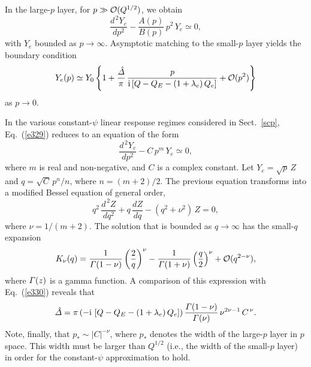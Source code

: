 \documentclass[12pt,prb,aps]{revtex4-1}
\begin{document}
In the large-$p$ layer, for  $p\gg {\cal O}(Q^{1/2})$, we obtain 
\begin{equation}\label{e329}
\frac{d^{\,2} Y_e}{dp^2} - \frac{A(p)}{B(p)}\,p^2\,Y_e\simeq 0,
\end{equation}
with $Y_e$ bounded as $p\rightarrow \infty$. Asymptotic matching to the small-$p$ layer yields the boundary
condition 
\begin{equation}\label{e330}
Y_e(p)\simeq Y_0\left\{1+ \frac{\hat{\mit\Delta}}{\pi}\,\frac{p}{{\rm i}\,[Q-Q_E-(1+\lambda_e)\,Q_e]}+ {\cal O}(p^2)\right\}
\end{equation}
as $p\rightarrow 0$. 

In the various constant-$\psi$ linear response regimes considered in Sect.~\ref{scp}, Eq.~(\ref{e329}) reduces to an
equation of the form
\begin{equation}\label{e330a}
\frac{d^{\,2}Y_e}{dp^2}- C\,p^m\,Y_e\simeq 0,
\end{equation}
where $m$ is real and non-negative, and $C$ is a complex constant. Let $Y_e=\sqrt{p}\,Z$ and $q=\sqrt{C}\,p^n/n$, where
$n=(m+2)/2$. The previous equation transforms into a modified Bessel equation of general order, 
\begin{equation}
q^2\,\frac{d^{\,2}Z}{dq^2} + q\,\frac{dZ}{dq} - (q^2+\nu^2)\,Z =0,
\end{equation}
where $\nu=1/(m+2)$. The solution that is bounded as $q\rightarrow \infty$ has the small-$q$
expansion
\begin{equation}\label{e332}
K_\nu(q)= \frac{1}{{\mit\Gamma}(1-\nu)}\left(\frac{2}{q}\right)^\nu - \frac{1}{{\mit\Gamma}(1+\nu)}\left(\frac{q}{2}\right)^\nu + {\cal O}(q^{2-\nu}),
\end{equation}
where ${\mit\Gamma}(z)$ is a gamma function. 
A comparison of this expression with Eq.~(\ref{e330}) reveals that
\begin{equation}
\hat{\mit\Delta} = \pi\,(-{\rm i}\,\left[Q-Q_E-(1+\lambda_e)\,Q_e\right])\, \frac{{\mit\Gamma}(1-\nu)}{{\mit\Gamma}(\nu)}\,\nu^{2\nu-1}\,C^{\,\nu}.
\end{equation}
Note, finally, that $p_\ast\sim |C|^{-\nu}$, where $p_\ast$ denotes the width of the large-$p$ layer in $p$ space. This width must be larger than $Q^{1/2}$ (i.e., the width of the small-$p$ layer) in order for the constant-$\psi$ approximation to hold. 
\end{document}
